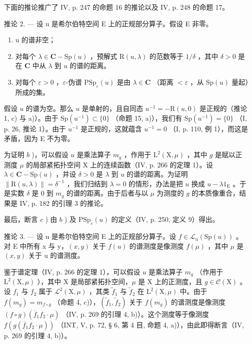 下面的推论推广了 IV, p. 247 的命题 16 的推论以及 IV, p. 248 的命题 17。

推论 2. --- 设 u 是希尔伯特空间 E 上的正规部分算子。假设 E 非零。

\begin{enumerate}
\def\labelenumi{\alph{enumi})}
\item
  u 的谱非空；
\item
  对每个 \(\lambda \in \mathbf{C} - \mathrm{Sp}(u)\) ，预解式 \(\mathrm{R}(u, \lambda)\) 的范数等于 \(1/\delta\) ，其中 \(\delta > 0\) 是在 \(\mathbf{C}\) 中从 \(\lambda\) 到 \(u\) 的谱的距离。
\item
  对每个 \(\varepsilon > 0\) ，\(\varepsilon\)-伪谱 \(\mathrm{PSp}_{\varepsilon}(u)\) 是由 \(\lambda \in \mathbf{C}\) （距离 \(< \varepsilon\) ，从 \(\mathrm{Sp}(u)\) 量起）所成的集。
\end{enumerate}

假设 \(u\) 的谱为空。那么 \(u\) 是单射的，且自同态 \(u^{-1} = -\mathrm{R}(u,0)\) 是正规的（推论 1, c) 与 a)）。由于 \(\mathrm{Sp}(u^{-1}) \subset \{0\}\) （命题 15, a)），我们有 \(\mathrm{Sp}(u^{-1}) = \{0\}\) （I, p. 26, 推论 1）。由于 \(u^{-1}\) 是正规的，这就蕴含 \(u^{-1} = 0\) （I, p. 110, 例 1），而这是矛盾，因为 E 不为零。

为证明 \(b\) )，可以假设 \(u\) 是乘法算子 \(m_g\) ，作用于 \(\mathrm{L}^2 (\mathrm{X},\mu)\) ，其中 \(g\) 是赋以正测度 \(\mu\) 的局部紧拓扑空间 X 上的连续函数（IV, p. 266 的定理 1）。设 \(\lambda \in \mathbf{C} - \mathrm{Sp}(u)\) ，并设 \(\delta >0\) 是 \(\lambda\) 到 \(u\) 的谱的距离。为证明 \(\| \mathrm{R}(u,\lambda)\| = \delta^{-1}\) ，我们归结到 \(\lambda = 0\) 的情形，办法是把 \(u\) 换成 \(u - \lambda 1_{\mathrm{E}}\) 。于是实数 \(\delta\) 是 0 到 \(m_g\) 的谱的距离。由于后者与以 \(\mu\) 为测度的 \(g\) 的本质像重合，结果是 IV, p. 182 的引理 3 的推论。

最后，断言 \(c\) ) 由 \(b\) ) 及 \(\mathrm{PSp}_{\varepsilon}(u)\) 的定义（IV, p. 250, 定义 9）得出。

推论 3. --- 设 u 是希尔伯特空间 E 上的正规部分算子。设 \(f \in \mathcal{L}_{\mathrm{u}}(\mathrm{Sp}(u))\) 。对 E 中所有 x 与 y，\((x, y)\) 关于 \(f(u)\) 的谱测度是像测度 \(f(\mu)\) ，其中 \(\mu\) 是 \((x, y)\) 关于 u 的谱测度。

鉴于谱定理（IV, p. 266 的定理 1），可以假设 \(u\) 是乘法算子 \(m_g\) （作用于 \(\mathrm{L}^2 (\mathrm{X},\mu)\) ），其中 X 是局部紧拓扑空间，\(\mu\) 是 X 上的正测度，且 \(g\in \mathcal{C}(\mathrm{X})\) 。设 \(f_{1}\) 与 \(f_{2}\) 属于 \(\mathcal{L}^2 (\mathrm{X},\mu)\) ，其类 \(\widetilde{f}_1\) 与 \(\widetilde{f}_2\) 在 \(\mathrm{L}^2 (\mathrm{X},\mu)\) 中。由于 \(f(m_g) = m_{f\circ g}\) （命题 4, c)），\((\widetilde{f}_1,\widetilde{f}_2)\) 关于 \(f(m_g)\) 的谱测度是像测度 \((f\circ g)(\overline{f}_1f_2\cdot \mu)\) （IV, p. 269 的引理 4, b)）。这个测度等于像测度 \(f(g(\overline{f}_1f_2\cdot \mu))\) （INT, V, p. 72, § 6, 第 4 目, 命题 4, a)），由此即得断言（IV, p. 269 的引理 4, b)）。

